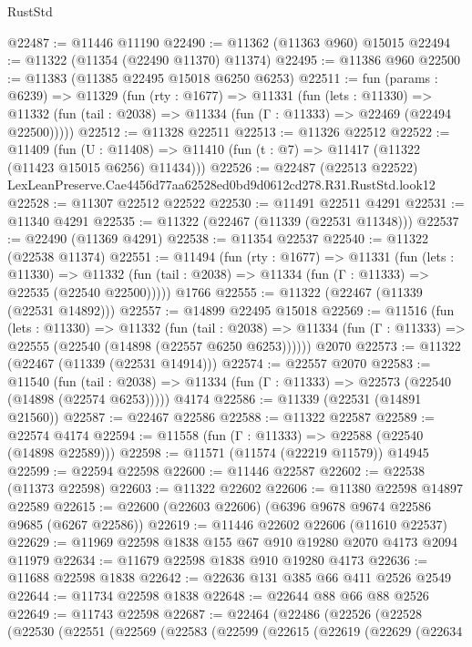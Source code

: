 \begin{lexlean}{RustStd}
\begin{coremodule}
@22487 := @11446 @11190
@22490 := @11362 (@11363 @960) @15015
@22494 := @11322 (@11354 (@22490 @11370) @11374)
@22495 := @11386 @960
@22500 := @11383 (@11385 @22495 @15018 @6250 @6253)
@22511 := fun (params : @6239) =>
  @11329
    (fun (rty : @1677) =>
    @11331
      (fun (lets : @11330) =>
      @11332 (fun (tail : @2038) => @11334 (fun (Γ : @11333) => @22469 (@22494 @22500)))))
@22512 := @11328 @22511
@22513 := @11326 @22512
@22522 := @11409
    (fun (U : @11408) => @11410 (fun (t : @7) => @11417 (@11322 (@11423 @15015 @6256) @11434)))
@22526 := @22487
    (@22513 @22522)
    LexLeanPreserve.Cae4456d77aa62528ed0bd9d0612cd278.R31.RustStd.look12
@22528 := @11307 @22512 @22522
@22530 := @11491 @22511 @4291
@22531 := @11340 @4291
@22535 := @11322 (@22467 (@11339 (@22531 @11348)))
@22537 := @22490 (@11369 @4291)
@22538 := @11354 @22537
@22540 := @11322 (@22538 @11374)
@22551 := @11494
    (fun (rty : @1677) =>
    @11331
      (fun (lets : @11330) =>
      @11332 (fun (tail : @2038) => @11334 (fun (Γ : @11333) => @22535 (@22540 @22500)))))
    @1766
@22555 := @11322 (@22467 (@11339 (@22531 @14892)))
@22557 := @14899 @22495 @15018
@22569 := @11516
    (fun (lets : @11330) =>
    @11332
      (fun (tail : @2038) =>
      @11334 (fun (Γ : @11333) => @22555 (@22540 (@14898 (@22557 @6250 @6253))))))
    @2070
@22573 := @11322 (@22467 (@11339 (@22531 @14914)))
@22574 := @22557 @2070
@22583 := @11540
    (fun (tail : @2038) => @11334 (fun (Γ : @11333) => @22573 (@22540 (@14898 (@22574 @6253)))))
    @4174
@22586 := @11339 (@22531 (@14891 @21560))
@22587 := @22467 @22586
@22588 := @11322 @22587
@22589 := @22574 @4174
@22594 := @11558 (fun (Γ : @11333) => @22588 (@22540 (@14898 @22589)))
@22598 := @11571 (@11574 (@22219 @11579)) @14945
@22599 := @22594 @22598
@22600 := @11446 @22587
@22602 := @22538 (@11373 @22598)
@22603 := @11322 @22602
@22606 := @11380 @22598 @14897 @22589
@22615 := @22600 (@22603 @22606) (@6396 @9678 @9674 @22586 @9685 (@6267 @22586))
@22619 := @11446 @22602 @22606 (@11610 @22537)
@22629 := @11969 @22598 @1838 @155 @67 @910 @19280 @2070 @4173 @2094 @11979
@22634 := @11679 @22598 @1838 @910 @19280 @4173
@22636 := @11688 @22598 @1838
@22642 := @22636 @131 @385 @66 @411 @2526 @2549
@22644 := @11734 @22598 @1838
@22648 := @22644 @88 @66 @88 @2526
@22649 := @11743 @22598
@22687 := @22464
    (@22486
      (@22526
        (@22528
          (@22530
            (@22551
              (@22569
                (@22583
                  (@22599
                    (@22615
                      (@22619
                        (@22629
                          (@22634

\end{coremodule}
\end{lexlean}
